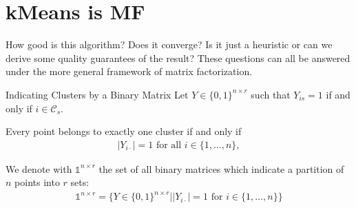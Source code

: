 \documentclass[letterpaper,10pt,english]{jupyterBook}
\begin{document}
\sphinxstepscope


\section{k\sphinxhyphen{}Means is MF}
\label{\detokenize{clustering_k_means_mf:k-means-is-mf}}\label{\detokenize{clustering_k_means_mf::doc}}
\sphinxAtStartPar
How good is this algorithm?
Does it converge? Is it just a heuristic or can we derive some quality guarantees of the result?
These questions can all be answered under the more general framework of matrix factorization.

\sphinxAtStartPar
Indicating Clusters by a Binary Matrix
Let \(Y\in\{0,1\}^{n\times r}\) such that \(Y_{is}=1\) if and only if \(i\in\mathcal{C}_s\).

\sphinxAtStartPar
Every point belongs to exactly one cluster if and only if \begin{equation*}
\begin{split}|Y_{i\cdot}|=1 \text{ for all } i\in\{1,\ldots,n\},\end{split}
\end{equation*}

\sphinxAtStartPar
We denote with \(\mathbb{1}^{n\times r}\) the set of all binary matrices which indicate a partition of \(n\) points into \(r\) sets:
\begin{equation*}
\begin{split}\mathbb{1}^{n\times r}=\{Y\in\{0,1\}^{n\times r}\vert |Y_{i\cdot}|=1 \text{ for } i\in\{1,\ldots,n\}\}\end{split}
\end{equation*}
\end{document}
